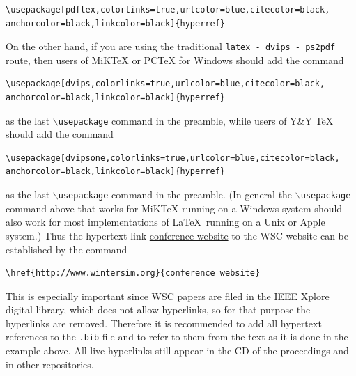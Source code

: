 \documentclass{wscpaperproc}
\theoremstyle{wsc}
\begin{document}
\begin{verbatim}
\usepackage[pdftex,colorlinks=true,urlcolor=blue,citecolor=black,
anchorcolor=black,linkcolor=black]{hyperref}
\end{verbatim}\vspace{5 mm}

\noindent On the other hand, if you are using the traditional {\tt latex - dvips - ps2pdf} route, then users of MiKTeX or PCTeX for Windows should add the command\newline


\begin{verbatim}
\usepackage[dvips,colorlinks=true,urlcolor=blue,citecolor=black,
anchorcolor=black,linkcolor=black]{hyperref}
\end{verbatim}\vspace{5 mm}


\noindent as the last {\tt $\backslash$usepackage} command in the preamble, while users of Y\&Y TeX should add the command\newline


\begin{verbatim}
\usepackage[dvipsone,colorlinks=true,urlcolor=blue,citecolor=black,
anchorcolor=black,linkcolor=black]{hyperref}
\end{verbatim}\vspace{5 mm}


\noindent as the last {\tt $\backslash$usepackage} command in the preamble.
(In general the {\tt $\backslash$usepackage} command above that works for MiKTeX running on a Windows system should also work for most implementations of \LaTeX\ running on a Unix or Apple system.)
Thus the hypertext link \href{http://www.wintersim.org}{conference website} \cite{WSC} to the WSC website can be established by the command\newline

\begin{verbatim}
\href{http://www.wintersim.org}{conference website}
\end{verbatim}\vspace{5 mm}


\noindent This is especially important since WSC papers are filed in the IEEE Xplore digital library, which does not allow hyperlinks, so for that purpose the hyperlinks are removed.
Therefore it is recommended to add all hypertext references to the {\tt .bib} file and to refer to them from the text as it is done in the example above.
All live hyperlinks still appear in the CD of the proceedings and in other repositories.
\end{document}
